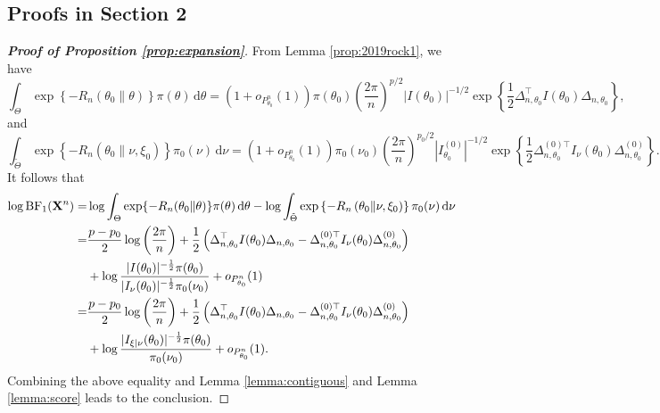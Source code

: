 \documentclass[11pt]{article}
\theoremstyle{plain}
\theoremstyle{definition}
\theoremstyle{remark}
\begin{document}
\begin{appendices}
\section{Proofs in Section 2}


    \begin{proof}[\textbf{Proof of Proposition \ref{prop:expansion}}]
From Lemma \ref{prop:2019rock1}, we have
$$
    \int_{\Theta}
    \exp\left\{-R_n(\theta_0\| \theta) \right\} \pi(\theta)
\, \mathrm d \theta
    =
    (1+o_{P^n_{\theta_0}}(1))
    \pi(\theta_0)
    \left(\frac{2\pi}{ n}\right)^{{p}/{2}}
    |I(\theta_0)|^{-{1}/{2}} 
    \exp
    \left\{ 
        \frac{1}{2}\Delta_{n,\theta_0}^\top  I({\theta_0})\Delta_{n,\theta_0}
\right\}
,
$$
and
\begin{equation*}
    \int_{\tilde \Theta}
    \exp\left\{- R_n\left(\theta_0\| \nu, \xi_0 \right)\right\} \pi_0(\nu)
\, \mathrm d \nu
    =
    (1+o_{P^n_{\theta_0}}(1))
    \pi_0(\nu_0)
    \left(\frac{2\pi}{ n}\right)^{{p_0}/{2}}
     |I_{\theta_0}^{(0)}|^{-{1}/{2}} 
     \exp\left\{ 
         \frac{1}{2}\Delta_{n,\theta_0}^{{(0)}\top} I_{\nu}(\theta_0)\Delta^{(0)}_{n,\theta_0}
     \right\}
     .
\end{equation*}
It follows that
\begin{align*}
    \log \text{BF}_1 (\mathbf{X}^{n})
    =&
    \log
    \int_{\Theta}
    \exp\{- R_n(\theta_0\| \theta)\} \pi(\theta)
\, \mathrm d \theta
-
    \log \int_{\tilde \Theta}
    \exp\left\{- R_n\left(\theta_0\| \nu, \xi_0 \right)\right\} \pi_0(\nu)
\, \mathrm d \nu
    \\
    =&
   {\frac{p-p_0}{2}} \log \left( \frac{2\pi}{n} \right)
+
        \frac 1 2 \left( 
            \Delta_{n,\theta_0}^\top  I(\theta_0)  \Delta_{n,\theta_0}
            -
            \Delta_{n,\theta_0}^{{(0)}\top} I_{\nu}(\theta_0)\Delta^{(0)}_{n,\theta_0}
        \right)
        \\
   &+
   \log
       \frac{
           |I(\theta_0)|^{-\frac 1 2}\pi(\theta_0) 
   }{
       |I_\nu(\theta_0)|^{-\frac 1 2}\pi_0(\nu_0)
}
    +o_{P^n_{\theta_0}}(1)
    \\
    =&
   {\frac{p-p_0}{2}} \log \left( \frac{2\pi}{n} \right)
+
        \frac 1 2 \left( 
            \Delta_{n,\theta_0}^\top  I(\theta_0)  \Delta_{n,\theta_0}
            -
            \Delta_{n,\theta_0}^{{(0)}\top} I_{\nu}(\theta_0)\Delta^{(0)}_{n,\theta_0}
        \right)
        \\
   &+
   \log
       \frac{
           |I_{\xi | \nu}(\theta_0)|^{-\frac 1 2}\pi(\theta_0) 
   }{
    \pi_0(\nu_0)
}
    +o_{P^n_{\theta_0}}(1)
    .
\end{align*}
Combining the above equality and Lemma \ref{lemma:contiguous} and Lemma \ref{lemma:score} leads to the conclusion.
    \end{proof}




\end{appendices}
\end{document}

